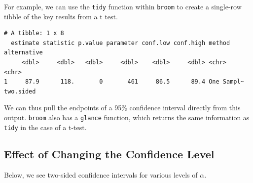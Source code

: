 \documentclass[
]{book}
\newenvironment{Shaded}{\begin{snugshade}}{\end{snugshade}}
\newcommand{\DataTypeTok}[1]{\textcolor[rgb]{0.13,0.29,0.53}{#1}}
\newcommand{\FloatTok}[1]{\textcolor[rgb]{0.00,0.00,0.81}{#1}}
\newcommand{\KeywordTok}[1]{\textcolor[rgb]{0.13,0.29,0.53}{\textbf{#1}}}
\newcommand{\NormalTok}[1]{#1}
\newcommand{\OperatorTok}[1]{\textcolor[rgb]{0.81,0.36,0.00}{\textbf{#1}}}
\newcommand{\StringTok}[1]{\textcolor[rgb]{0.31,0.60,0.02}{#1}}
\begin{document}
For example, we can use the \texttt{tidy} function within \texttt{broom} to create a single-row tibble of the key results from a t test.

\begin{Shaded}
\end{Shaded}

\begin{verbatim}
# A tibble: 1 x 8
  estimate statistic p.value parameter conf.low conf.high method     alternative
     <dbl>     <dbl>   <dbl>     <dbl>    <dbl>     <dbl> <chr>      <chr>      
1     87.9      118.       0       461     86.5      89.4 One Sampl~ two.sided  
\end{verbatim}

We can thus pull the endpoints of a 95\% confidence interval directly from this output. \texttt{broom} also has a \texttt{glance} function, which returns the same information as \texttt{tidy} in the case of a t-test.

\hypertarget{effect-of-changing-the-confidence-level}{%
\subsection{Effect of Changing the Confidence Level}\label{effect-of-changing-the-confidence-level}}

Below, we see two-sided confidence intervals for various levels of \(\alpha\).
\end{document}
